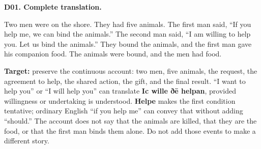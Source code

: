 \par\begin{minipage}{\linewidth}\raggedright
{}
\end{minipage}\par

\par\begin{minipage}{\linewidth}\raggedright
\textbf{D01. Complete translation.}

Two men were on the shore. They had five animals. The first man said, “If you help me, we can bind the animals.” The second man said, “I am willing to help you. Let us bind the animals.” They bound the animals, and the first man gave his companion food. The animals were bound, and the men had food.

\textbf{Target:} preserve the continuous account: two men, five animals, the request, the agreement to help, the shared action, the gift, and the final result. “I want to help you” or “I will help you” can translate \textbf{Ic wille ðē helpan}, provided willingness or undertaking is understood. \textbf{Helpe} makes the first condition tentative; ordinary English “if you help me” can convey that without adding “should.” The account does not say that the animals are killed, that they are the food, or that the first man binds them alone. Do not add those events to make a different story.

\end{minipage}\par\addvspace{4pt}

